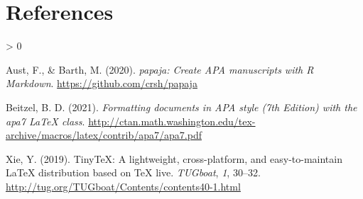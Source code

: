 \documentclass[jou]{apa7}
\newlength{\cslhangindent}
\newenvironment{CSLReferences}[2] %
 {%
  \setlength{\parindent}{0pt}
  \ifodd #1 \everypar{\setlength{\hangindent}{\cslhangindent}}\ignorespaces\fi
  \ifnum #2 > 0
  \setlength{\parskip}{#2\baselineskip}
  \fi
 }%
 {}
\begin{document}
\hypertarget{references}{%
\section*{References}\label{references}}

\hypertarget{refs}{}
\begin{CSLReferences}{1}{0}
\leavevmode\hypertarget{ref-austbarth2020}{}%
Aust, F., \& Barth, M. (2020). \emph{{papaja}: {Create} {APA}
manuscripts with {R Markdown}}. \url{https://github.com/crsh/papaja}

\leavevmode\hypertarget{ref-weiss2021}{}%
Beitzel, B. D. (2021). \emph{Formatting documents in {APA} style (7th
{E}dition) with the apa7 LaTeX class}.
\url{http://ctan.math.washington.edu/tex-archive/macros/latex/contrib/apa7/apa7.pdf}

\leavevmode\hypertarget{ref-xie2019}{}%
Xie, Y. (2019). TinyTeX: A lightweight, cross-platform, and
easy-to-maintain LaTeX distribution based on TeX live. \emph{TUGboat},
\emph{1}, 30--32.
\url{http://tug.org/TUGboat/Contents/contents40-1.html}

\end{CSLReferences}
\end{document}
